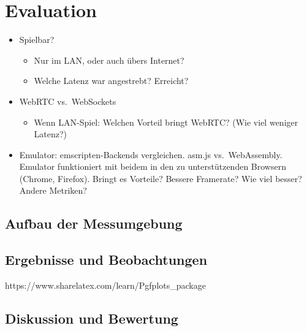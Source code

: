 \chapter{Evaluation}\label{evaluation}

\blindtext[1]

\begin{itemize}
\tightlist
\item
  Spielbar?

  \begin{itemize}
  \tightlist
  \item
    Nur im LAN, oder auch übers Internet?
  \item
    Welche Latenz war angestrebt? Erreicht?
  \end{itemize}
\item
  WebRTC vs.~WebSockets

  \begin{itemize}
  \tightlist
  \item
    Wenn LAN-Spiel: Welchen Vorteil bringt WebRTC? (Wie viel weniger
    Latenz?)
  \end{itemize}
\item
  Emulator: emscripten-Backends vergleichen. asm.js vs.~WebAssembly.
  Emulator funktioniert mit beidem in den zu unterstützenden Browsern
  (Chrome, Firefox). Bringt es Vorteile? Bessere Framerate? Wie viel
  besser? Andere Metriken?
\end{itemize}

\section{Aufbau der Messumgebung}\label{aufbau-der-messumgebung}

\section{Ergebnisse und
Beobachtungen}\label{ergebnisse-und-beobachtungen}

https://www.sharelatex.com/learn/Pgfplots\_package


\section{Diskussion und Bewertung}\label{diskussion-und-bewertung}
